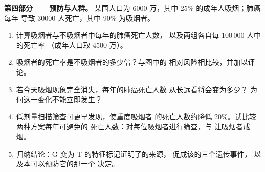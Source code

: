 \begin{problem}
\medskip
\noindent\textbf{第四部分——预防与人群。}
某国人口为 6000 万，其中 25\% 的成年人吸烟；肺癌每年
导致 $\num{30000}$ 人死亡，其中 90\% 为吸烟者。
\begin{enumerate}[resume]
  \item 计算吸烟者与不吸烟者中每年的肺癌死亡人数，
        以及两组各自每 100\,000 人中的死亡率
        （成年人口取 4500 万）。
  \item 吸烟者的死亡率是不吸烟者的多少倍？与图中的
        相对风险相比较，并加以评论。
  \item 若今天吸烟现象完全消失，每年的肺癌死亡人数
        从长远看将会变为多少？
        为何这一变化不能立即发生？
  \item 低剂量扫描筛查可更早发现，使重度吸烟者
        的死亡人数约降低 20\%。试比较两种方案每年可避免的
        死亡人数：对每位吸烟者进行筛查，与
        让吸烟者戒烟。
  \item 归纳结论：G 变为 T 的特征标记证明了的来源，
        促成该的三个遗传事件，
        以及本可以预防它的那一个
        决定。
\end{enumerate}
\end{problem}
